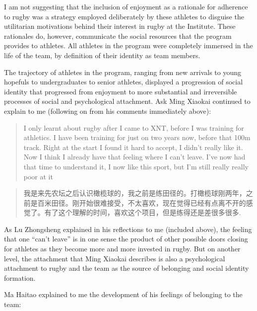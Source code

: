 \begin{CJK}{UTF8}{gbsn}
I am not suggesting that the inclusion of enjoyment as a rationale for adherence to rugby was a strategy employed deliberately by these athletes to disguise the utilitarian motivations behind their interest in rugby at the Institute.  These rationales do, however,  communicate the social resources that the program provides to athletes.  All athletes in the program were completely immersed in the life of the team, by definition of their identity as team members.

The trajectory of athletes in the program, ranging from new arrivals to young hopefuls to undergraduates to senior athletes, displayed a progression of social identity that progressed from enjoyment to more substantial and irreversible processes of social and psychological attachment.  Ask Ming Xiaokai continued to explain to me (following on from his comments immediately above):

\begin{quotation}
    I only learnt about rugby after I came to XNT, before I was training for athletics. I have been training for just on two years now, before that 100m track.  Right at the start I found it hard to accept, I didn’t really like it. Now I think I already have that feeling where I can’t leave.  I’ve now had that time to understand it, I now like this sport, but I’m still really really poor at it
\end{quotation}

\begin{quotation}
    我是来先农坛之后认识橄榄球的，我之前是练田径的。打橄榄球刚两年，之前是百米田径。刚开始很难接受，不太喜欢，现在觉得已经有点离不开的感觉了。有了这个理解的时间，喜欢这个项目，但是练得还是差很多很多.
\end{quotation}

As Lu Zhongsheng explained in his reflections to me (included above), the feeling that one ``can't leave'' is in one sense the product of other possible doors closing for athletes as they become more and more invested in rugby.  But on another level, the attachment that Ming Xiaokai describes is also a psychological attachment to rugby and the team as the source of belonging and social identity formation.

Ma Haitao explained to me the development of his feelings of belonging to the team:


\end{CJK}
